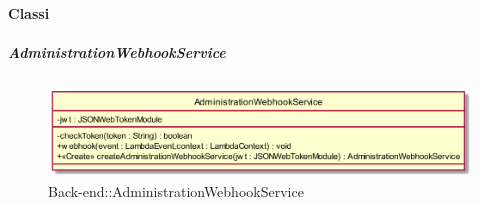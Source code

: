 \paragraph{Classi}
\hypertarget{AdministrationWebhookService_label}{\subparagraph{AdministrationWebhookService}}
\begin{figure}[h]
	\centering
	\includegraphics[width=\textwidth,height=\textheight,keepaspectratio]{images/ClassAdministrationWebhookService.png}
	\caption{Back-end::AdministrationWebhookService}
\end{figure}
